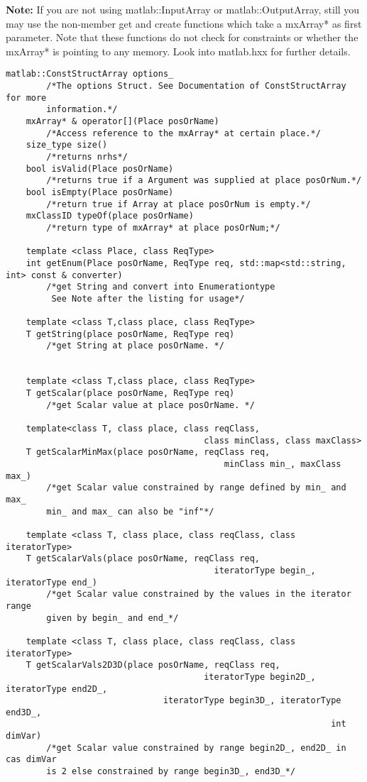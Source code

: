 \documentclass[a4paper,10pt]{article}
\begin{document}
\textbf{Note:} If you are not using matlab::InputArray or matlab::OutputArray, still you may use
the non-member get and create functions  which take a mxArray* as first parameter. 
Note that these functions do not check for constraints or whether the mxArray* is pointing to any
memory. Look into matlab.hxx for further details.

\begin{lstlisting}[caption={matlab::InputArray}]
	matlab::ConstStructArray options_ 
		/*The options Struct. See Documentation of ConstStructArray for more 
		information.*/
	mxArray* & operator[](Place posOrName)
		/*Access reference to the mxArray* at certain place.*/
	size_type size()
		/*returns nrhs*/
	bool isValid(Place posOrName)
		/*returns true if a Argument was supplied at place posOrNum.*/
	bool isEmpty(Place posOrName)
		/*return true if Array at place posOrNum is empty.*/
	mxClassID typeOf(place posOrName)
		/*return type of mxArray* at place posOrNum;*/

    template <class Place, class ReqType>
    int getEnum(Place posOrName, ReqType req, std::map<std::string, int> const & converter)
		/*get String and convert into Enumerationtype
		 See Note after the listing for usage*/

	template <class T,class place, class ReqType>
	T getString(place posOrName, ReqType req)
		/*get String at place posOrName. */


	template <class T,class place, class ReqType>
	T getScalar(place posOrName, ReqType req)
		/*get Scalar value at place posOrName. */
    
	template<class T, class place, class reqClass, 
                                       class minClass, class maxClass>
	T getScalarMinMax(place posOrName, reqClass req, 
                                           minClass min_, maxClass max_)
		/*get Scalar value constrained by range defined by min_ and max_
		min_ and max_ can also be "inf"*/
	
	template <class T, class place, class reqClass, class iteratorType>
	T getScalarVals(place posOrName, reqClass req, 
                                         iteratorType begin_, iteratorType end_)
		/*get Scalar value constrained by the values in the iterator range 
		given by begin_ and end_*/

	template <class T, class place, class reqClass, class iteratorType>
	T getScalarVals2D3D(place posOrName, reqClass req, 
                                       iteratorType begin2D_, iteratorType end2D_,
		                       iteratorType begin3D_, iteratorType end3D_,
		                                                        int dimVar)
		/*get Scalar value constrained by range begin2D_, end2D_ in cas dimVar 
		is 2 else constrained by range begin3D_, end3D_*/


\end{lstlisting}
\end{document}
